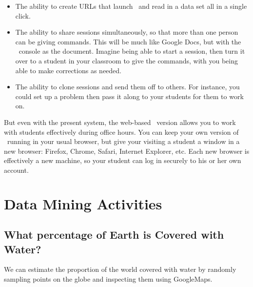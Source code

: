\begin{itemize}
\item
The ability to create URLs that launch \RStudio\ and read in a data set all in a single 
click.
\item The ability to share sessions simultaneously, so that more than
  one person can be giving commands.  This will be much like Google Docs, but with the
  \R\ console as the document.   Imagine being able to start a
  session, then turn it over to a student in your classroom to give
  the commands, with you being able to make corrections as needed.
\item The ability to clone sessions and send them off to others.  For
  instance, you could set up a problem then pass it along to your
  students for them to work on.  
\end{itemize}

But even with the present system, the web-based \RStudio\ version
allows you to work with students effectively during office hours.  You
can keep your own version of \RStudio\ running in your usual browser, but give your visiting a
student a window in a new browser: Firefox, Chrome, Safari, Internet
Explorer, etc.  Each new browser is effectively a new machine, so your
student can log in securely to his or her own account.



\section{Data Mining Activities}

\subsection{What percentage of Earth is Covered with Water?}
\label{sec:googleMap}
We can estimate the proportion of the world covered with water by randomly 
sampling points on the globe and inspecting them using GoogleMaps.

